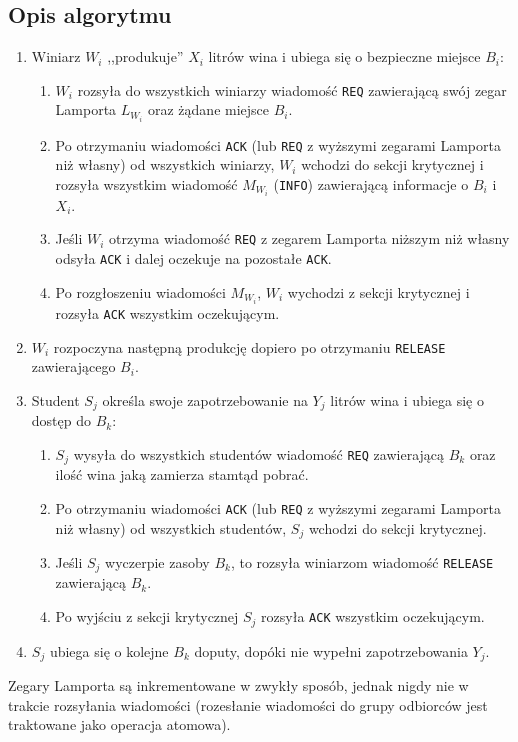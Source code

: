 \documentclass[12pt, a4paper, oneside]{article}
\begin{document}
\subsection*{Opis algorytmu}

\begin{enumerate}
    \item Winiarz $ W_{i} $ ,,produkuje'' $ X_{i} $ litrów wina i ubiega się o bezpieczne miejsce $ B_{i} $:
    \begin{enumerate}
        \item  $ W_{i} $ rozsyła do wszystkich winiarzy wiadomość \texttt{REQ} zawierającą swój zegar Lamporta $ L_{W_{i}} $ oraz żądane miejsce $ B_{i} $.
        \item Po otrzymaniu wiadomości \texttt{ACK} (lub \texttt{REQ} z wyższymi zegarami Lamporta niż własny) od wszystkich winiarzy,
        $ W_{i} $ wchodzi do sekcji krytycznej i rozsyła wszystkim wiadomość $ M_{W_{i}} $ (\texttt{INFO}) zawierającą informacje o $ B_{i} $ i $ X_{i} $.
        \item Jeśli $ W_{i} $ otrzyma wiadomość \texttt{REQ} z zegarem Lamporta niższym niż własny odsyła \texttt{ACK} i dalej oczekuje na pozostałe \texttt{ACK}.
        \item Po rozgłoszeniu wiadomości $ M_{W_{i}} $, $ W_{i} $ wychodzi z sekcji krytycznej i rozsyła \texttt{ACK} wszystkim oczekującym.
    \end{enumerate}
    \item $ W_{i} $ rozpoczyna następną produkcję dopiero po otrzymaniu \texttt{RELEASE} zawierającego $ B_{i} $.
    
    \item Student $ S_{j} $ określa swoje zapotrzebowanie na $ Y_{j} $ litrów wina i ubiega się o dostęp do $ B_{k} $:
    \begin{enumerate}
        \item $ S_{j} $ wysyła do wszystkich studentów wiadomość \texttt{REQ} zawierającą $ B_{k} $ oraz ilość wina jaką zamierza stamtąd pobrać.
        \item Po otrzymaniu wiadomości \texttt{ACK} (lub \texttt{REQ} z wyższymi zegarami Lamporta niż własny) od wszystkich studentów,
        $ S_{j} $ wchodzi do sekcji krytycznej.
        \item Jeśli $ S_{j} $ wyczerpie zasoby $ B_{k} $, to rozsyła winiarzom wiadomość \texttt{RELEASE} zawierającą $ B_{k} $.
        \item Po wyjściu z sekcji krytycznej $ S_{j} $ rozsyła \texttt{ACK} wszystkim oczekującym.
    \end{enumerate}
    \item $ S_{j} $ ubiega się o kolejne $ B_{k} $ doputy, dopóki nie wypełni zapotrzebowania $ Y_{j} $.
\end{enumerate}

Zegary Lamporta są inkrementowane w zwykły sposób, jednak nigdy nie w trakcie rozsyłania wiadomości (rozesłanie wiadomości do grupy odbiorców jest traktowane jako operacja atomowa).
\end{document}
